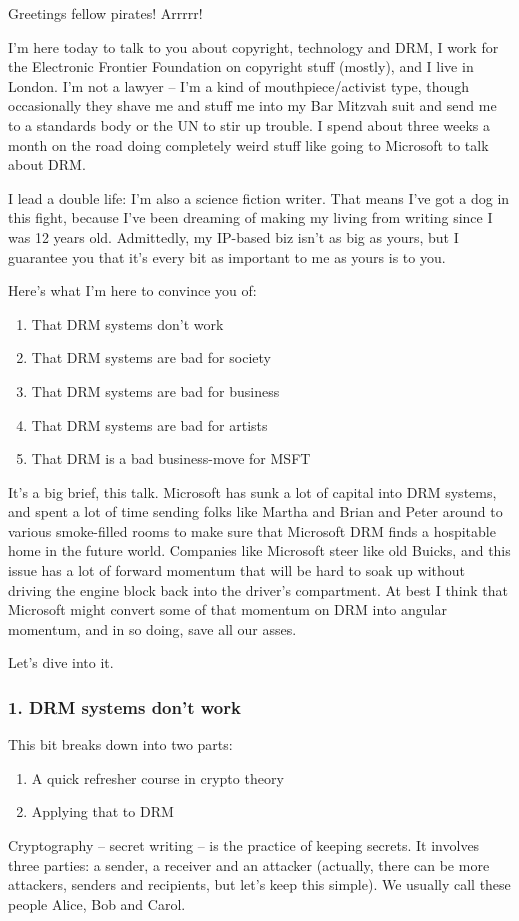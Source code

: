 Greetings fellow pirates! Arrrrr!

I'm here today to talk to you about copyright, technology and DRM,
I work for the Electronic Frontier Foundation on copyright stuff
(mostly), and I live in London. I'm not a lawyer -- I'm a kind of
mouthpiece/activist type, though occasionally they shave me and
stuff me into my Bar Mitzvah suit and send me to a standards body
or the UN to stir up trouble. I spend about three weeks a month on
the road doing completely weird stuff like going to Microsoft to
talk about DRM.

I lead a double life: I'm also a science fiction writer. That means
I've got a dog in this fight, because I've been dreaming of making
my living from writing since I was 12 years old. Admittedly, my
IP-based biz isn't as big as yours, but I guarantee you that it's
every bit as important to me as yours is to you.

Here's what I'm here to convince you of:

\begin{enumerate}
\item
  That DRM systems don't work
\item
  That DRM systems are bad for society
\item
  That DRM systems are bad for business
\item
  That DRM systems are bad for artists
\item
  That DRM is a bad business-move for MSFT
\end{enumerate}
It's a big brief, this talk. Microsoft has sunk a lot of capital
into DRM systems, and spent a lot of time sending folks like Martha
and Brian and Peter around to various smoke-filled rooms to make
sure that Microsoft DRM finds a hospitable home in the future
world. Companies like Microsoft steer like old Buicks, and this
issue has a lot of forward momentum that will be hard to soak up
without driving the engine block back into the driver's
compartment. At best I think that Microsoft might convert some of
that momentum on DRM into angular momentum, and in so doing, save
all our asses.

Let's dive into it.

\subsubsection{1. DRM systems don't work}

This bit breaks down into two parts:

\begin{enumerate}
\item
  A quick refresher course in crypto theory
\item
  Applying that to DRM
\end{enumerate}
Cryptography -- secret writing -- is the practice of keeping
secrets. It involves three parties: a sender, a receiver and an
attacker (actually, there can be more attackers, senders and
recipients, but let's keep this simple). We usually call these
people Alice, Bob and Carol.

